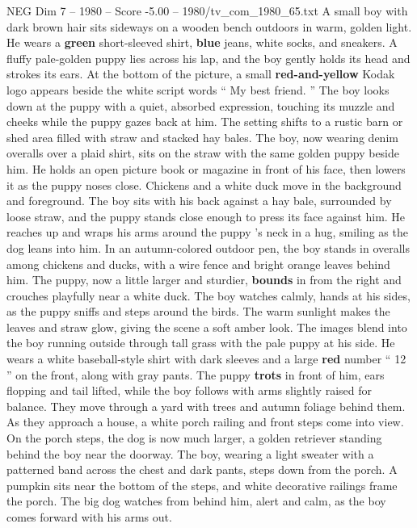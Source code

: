 \begin{textsample}{NEG Dim 7 – 1980 – Score -5.00 – 1980/tv\_com\_1980\_65.txt}  \label{ex:f7_neg_055}
A small boy with dark brown hair sits sideways on a wooden bench outdoors in warm, golden light.
He wears a \textbf{green} short-sleeved shirt, \textbf{blue} jeans, white socks, and sneakers.
A fluffy pale-golden puppy lies across his lap, and the boy gently holds its head and strokes its ears.
At the bottom of the picture, a small \textbf{red-and-yellow} Kodak logo appears beside the white script words “ My best friend. ” The boy looks down at the puppy with a quiet, absorbed expression, touching its muzzle and cheeks while the puppy gazes back at him.
The setting shifts to a rustic barn or shed area filled with straw and stacked hay bales.
The boy, now wearing denim overalls over a plaid shirt, sits on the straw with the same golden puppy beside him.
He holds an open picture book or magazine in front of his face, then lowers it as the puppy noses close.
Chickens and a white duck move in the background and foreground.
The boy sits with his back against a hay bale, surrounded by loose straw, and the puppy stands close enough to press its face against him.
He reaches up and wraps his arms around the puppy ’s neck in a hug, smiling as the dog leans into him.
In an autumn-colored outdoor pen, the boy stands in overalls among chickens and ducks, with a wire fence and bright orange leaves behind him.
The puppy, now a little larger and sturdier, \textbf{bounds} in from the right and crouches playfully near a white duck.
The boy watches calmly, hands at his sides, as the puppy sniffs and steps around the birds.
The warm sunlight makes the leaves and straw glow, giving the scene a soft amber look.
The images blend into the boy running outside through tall grass with the pale puppy at his side.
He wears a white baseball-style shirt with dark sleeves and a large \textbf{red} number “ 12 ” on the front, along with gray pants.
The puppy \textbf{trots} in front of him, ears flopping and tail lifted, while the boy follows with arms slightly raised for balance.
They move through a yard with trees and autumn foliage behind them.
As they approach a house, a white porch railing and front steps come into view.
On the porch steps, the dog is now much larger, a golden retriever standing behind the boy near the doorway.
The boy, wearing a light sweater with a patterned band across the chest and dark pants, steps down from the porch.
A pumpkin sits near the bottom of the steps, and white decorative railings frame the porch.
The big dog watches from behind him, alert and calm, as the boy comes forward with his arms out.

\end{textsample}
